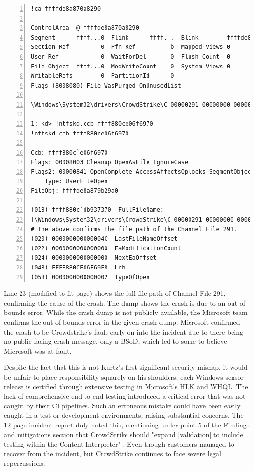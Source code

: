 \begin{lstlisting}[caption=Inspecting csagent.sys, numbers=left]
!ca ffffde8a870a8290

ControlArea  @ ffffde8a870a8290
Segment      ffff...0  Flink      ffff...  Blink        ffffde8a870a7d98
Section Ref         0  Pfn Ref          b  Mapped Views 0
User Ref            0  WaitForDel       0  Flush Count  0
File Object  ffff...0  ModWriteCount    0  System Views 0
WritableRefs        0  PartitionId      0  
Flags (8008080) File WasPurged OnUnusedList 

\Windows\System32\drivers\CrowdStrike\C-00000291-00000000-00000032.sys
    
1: kd> !ntfskd.ccb ffff880ce06f6970
!ntfskd.ccb ffff880ce06f6970
    
Ccb: ffff880c`e06f6970
Flags: 00008003 Cleanup OpenAsFile IgnoreCase
Flags2: 00000841 OpenComplete AccessAffectsOplocks SegmentObjectReferenced
    Type: UserFileOpen
FileObj: ffffde8a879b29a0
    
(018) ffff880c`db937370  FullFileName: 
[\Windows\System32\drivers\CrowdStrike\C-00000291-00000000-00000032.sys]
# The above confirms the file path of the Channel File 291.
(020) 000000000000004C  LastFileNameOffset 
(022) 0000000000000000  EaModificationCount 
(024) 0000000000000000  NextEaOffset 
(048) FFFF880CE06F69F8  Lcb 
(058) 0000000000000002  TypeOfOpen 
\end{lstlisting}

\noindent

\noindent
Line 23 (modified to fit page) shows the full file path of Channel File 291, confirming the cause of the crash.
The dump shows the crash is due to an out-of-bounds error.
While the crash dump is not publicly available, the Microsoft team confirms the out-of-bounds error in the given crash dump.
Microsoft confirmed the crash to be Crowdstrike's fault early on into the incident due to there being no public facing crash message, only a BSoD, which led to some to believe Microsoft was at fault.

Despite the fact that this is not Kurtz's first significant security mishap, it would be unfair to place responsibility squarely on his shoulders: 
each Windows sensor release is certified through extensive testing in Microsoft's HLK and WHQL.
The lack of comprehensive end-to-end testing introduced a critical error that was not caught by their CI pipelines. Such an erroneous
mistake could have been easily caught in a test or development environments, raising substantial concerns. 
The 12 page incident report duly noted this, mentioning under point 5 of the Findings and mitigations section that CrowdStrike should 
"expand [validation] to include testing within the Content Interpreter" \cite{crowdstrikechannelfile291rca}.
Even though customers managed to recover from the incident, but CrowdStrike continues to face severe legal repercussions.

